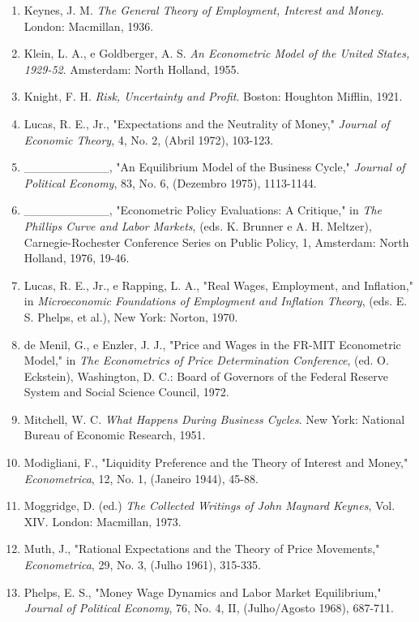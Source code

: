 \documentclass[12pt]{article}
\begin{document}
\begin{enumerate}
    \item Keynes, J. M. \textit{The General Theory of Employment, Interest and Money}. London: Macmillan, 1936.
    \item Klein, L. A., e Goldberger, A. S. \textit{An Econometric Model of the United States, 1929-52}. Amsterdam: North Holland, 1955.
    \item Knight, F. H. \textit{Risk, Uncertainty and Profit}. Boston: Houghton Mifflin, 1921.
    \item Lucas, R. E., Jr., "Expectations and the Neutrality of Money," \textit{Journal of Economic Theory}, 4, No. 2, (Abril 1972), 103-123.
    \item \_\_\_\_\_\_\_\_\_\_, "An Equilibrium Model of the Business Cycle," \textit{Journal of Political Economy}, 83, No. 6, (Dezembro 1975), 1113-1144.
    \item \_\_\_\_\_\_\_\_\_\_, "Econometric Policy Evaluations: A Critique," in \textit{The Phillips Curve and Labor Markets}, (eds. K. Brunner e A. H. Meltzer), Carnegie-Rochester Conference Series on Public Policy, 1, Amsterdam: North Holland, 1976, 19-46.
    \item Lucas, R. E., Jr., e Rapping, L. A., "Real Wages, Employment, and Inflation," in \textit{Microeconomic Foundations of Employment and Inflation Theory}, (eds. E. S. Phelps, et al.), New York: Norton, 1970.
    \item de Menil, G., e Enzler, J. J., "Price and Wages in the FR-MIT Econometric Model," in \textit{The Econometrics of Price Determination Conference}, (ed. O. Eckstein), Washington, D. C.: Board of Governors of the Federal Reserve System and Social Science Council, 1972.
    \item Mitchell, W. C. \textit{What Happens During Business Cycles}. New York: National Bureau of Economic Research, 1951.
    \item Modigliani, F., "Liquidity Preference and the Theory of Interest and Money," \textit{Econometrica}, 12, No. 1, (Janeiro 1944), 45-88.
    \item Moggridge, D. (ed.) \textit{The Collected Writings of John Maynard Keynes}, Vol. XIV. London: Macmillan, 1973.
    \item Muth, J., "Rational Expectations and the Theory of Price Movements," \textit{Econometrica}, 29, No. 3, (Julho 1961), 315-335.
    \item Phelps, E. S., "Money Wage Dynamics and Labor Market Equilibrium," \textit{Journal of Political Economy}, 76, No. 4, II, (Julho/Agosto 1968), 687-711.

\end{enumerate}
\end{document}
